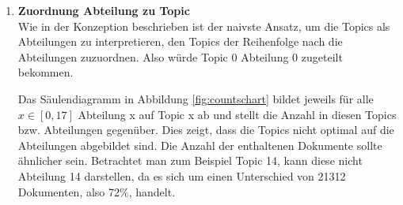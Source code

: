 \documentclass[german,version-2020-11]{uzl-thesis}
\begin{document}
\begin{itemize}
\begin{enumerate}
\item \textbf{Zuordnung Abteilung zu Topic}\\
Wie in der Konzeption beschrieben ist der naivste Ansatz, um die Topics als Abteilungen zu interpretieren, den Topics der Reihenfolge nach die Abteilungen zuzuordnen. Also würde Topic 0 Abteilung 0 zugeteilt bekommen. \\
\begin{center}
\end{center}

Das Säulendiagramm in Abbildung \ref{fig:countschart} bildet jeweils für alle $x \in [0,17]$ Abteilung x auf Topic x ab und stellt die Anzahl in diesen Topics bzw. Abteilungen gegenüber. Dies zeigt, dass die Topics nicht optimal auf die Abteilungen abgebildet sind. Die Anzahl der enthaltenen Dokumente sollte ähnlicher sein. Betrachtet man zum Beispiel Topic 14, kann diese nicht Abteilung 14 darstellen, da es sich um einen Unterschied von 21312 Dokumenten, also 72$\%$, handelt.\\


\end{enumerate}
\end{itemize}
\end{document}
